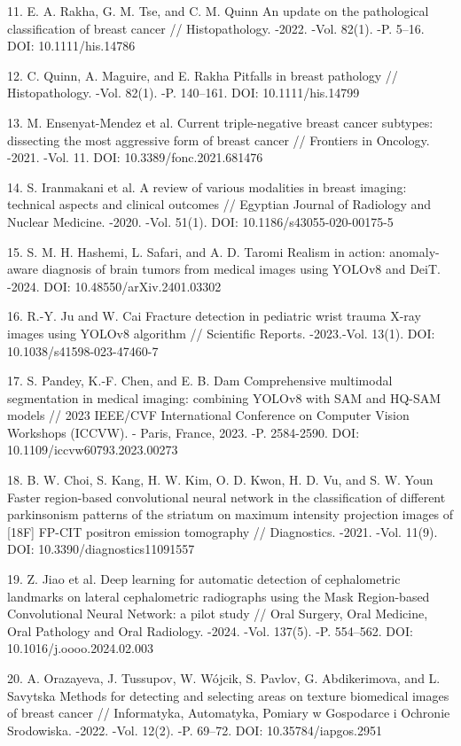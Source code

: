 11. E. A. Rakha, G. M. Tse, and C. M. Quinn An update on the
pathological classification of breast cancer // Histopathology. -2022.
-Vol. 82(1). -P. 5--16. DOI: 10.1111/his.14786

12. C. Quinn, A. Maguire, and E. Rakha Pitfalls in breast pathology //
Histopathology. -Vol. 82(1). -P. 140--161. DOI: 10.1111/his.14799

13. M. Ensenyat-Mendez et al. Current triple-negative breast cancer
subtypes: dissecting the most aggressive form of breast cancer //
Frontiers in Oncology. -2021. -Vol. 11. DOI: 10.3389/fonc.2021.681476

14. S. Iranmakani et al. A review of various modalities in breast
imaging: technical aspects and clinical outcomes // Egyptian Journal of
Radiology and Nuclear Medicine. -2020. -Vol. 51(1). DOI:
10.1186/s43055-020-00175-5

15. S. M. H. Hashemi, L. Safari, and A. D. Taromi Realism in action:
anomaly-aware diagnosis of brain tumors from medical images using YOLOv8
and DeiT. -2024. DOI: 10.48550/arXiv.2401.03302

16. R.-Y. Ju and W. Cai Fracture detection in pediatric wrist trauma
X-ray images using YOLOv8 algorithm // Scientific Reports. -2023.-Vol.
13(1). DOI: 10.1038/s41598-023-47460-7

17. S. Pandey, K.-F. Chen, and E. B. Dam Comprehensive multimodal
segmentation in medical imaging: combining YOLOv8 with SAM and HQ-SAM
models // 2023 IEEE/CVF International Conference on Computer Vision
Workshops (ICCVW). - Paris, France, 2023. -P. 2584-2590. DOI:
10.1109/iccvw60793.2023.00273

18. B. W. Choi, S. Kang, H. W. Kim, O. D. Kwon, H. D. Vu, and S. W. Youn
Faster region-based convolutional neural network in the classification
of different parkinsonism patterns of the striatum on maximum intensity
projection images of {[}18F{]} FP-CIT positron emission tomography //
Diagnostics. -2021. -Vol. 11(9). DOI: 10.3390/diagnostics11091557

19. Z. Jiao et al. Deep learning for automatic detection of
cephalometric landmarks on lateral cephalometric radiographs using the
Mask Region-based Convolutional Neural Network: a pilot study // Oral
Surgery, Oral Medicine, Oral Pathology and Oral Radiology. -2024. -Vol.
137(5). -P. 554--562. DOI: 10.1016/j.oooo.2024.02.003

20. A. Orazayeva, J. Tussupov, W. Wójcik, S. Pavlov, G. Abdikerimova,
and L. Savytska Methods for detecting and selecting areas on texture
biomedical images of breast cancer // Informatyka, Automatyka, Pomiary w
Gospodarce i Ochronie Srodowiska. -2022. -Vol. 12(2). -P. 69--72. DOI:
10.35784/iapgos.2951

